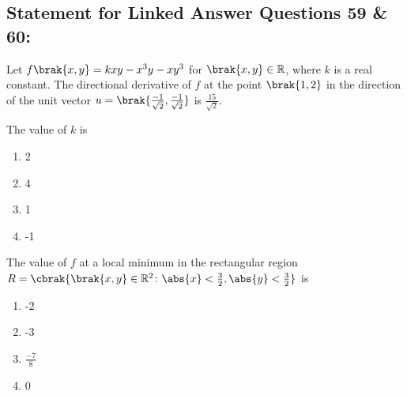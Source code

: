 \subsection*{Statement for Linked Answer Questions 59 \& 60:}
Let $f\brak{x,y} = kxy - x^3y - xy^3$ for $\brak{x,y} \in \mathbb{R}$, where $k$ is a real constant. The directional derivative of $f$ at the point $\brak{1,2}$ in the direction of the unit vector $u = \brak{\frac{-1}{\sqrt{2}}, \frac{-1}{\sqrt{2}}}$ is $\frac{15}{\sqrt{2}}$.
\item The value of $k$ is
\begin{multicols}{2}
    \begin{enumerate}
        \item 2
        \item 4
        \item 1
        \item -1
    \end{enumerate}
\end{multicols}
\item The value of $f$ at a local minimum in the rectangular region $R = \cbrak{\brak{x,y} \in \mathbb{R}^2 \colon \abs{x}< \frac{3}{2} , \abs{y} < \frac{3}{2}}$ is
\begin{multicols}{2}
    \begin{enumerate}
        \item -2
        \item -3
        \item $\frac{-7}{8}$
        \item 0
    \end{enumerate}
\end{multicols}

